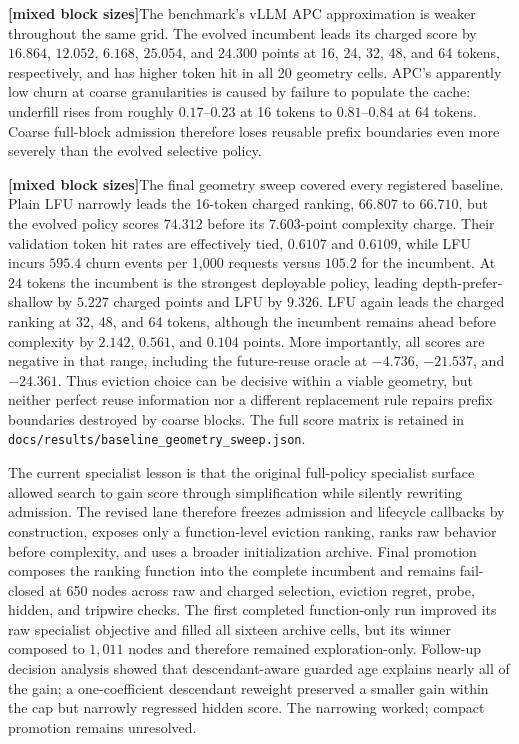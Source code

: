 \documentclass[11pt]{article}
\newcommand{\filepath}[1]{\nolinkurl{#1}}
\newcommand{\mixedblocktag}{\textbf{\color{navy}[mixed block sizes]}}
\begin{document}
\mixedblocktag The benchmark's vLLM APC approximation is weaker throughout the same grid.  The
evolved incumbent leads its charged score by \(16.864\), \(12.052\), \(6.168\),
\(25.054\), and \(24.300\) points at 16, 24, 32, 48, and 64 tokens,
respectively, and has higher token hit in all 20 geometry cells.  APC's apparently
low churn at coarse granularities is caused by failure to populate the cache:
underfill rises from roughly \(0.17\)--\(0.23\) at 16 tokens to
\(0.81\)--\(0.84\) at 64 tokens.  Coarse full-block admission therefore loses
reusable prefix boundaries even more severely than the evolved selective policy.

\mixedblocktag The final geometry sweep covered every registered baseline.  Plain LFU narrowly
leads the 16-token charged ranking, \(66.807\) to \(66.710\), but the evolved
policy scores \(74.312\) before its \(7.603\)-point complexity charge.  Their
validation token hit rates are effectively tied, \(0.6107\) and \(0.6109\), while
LFU incurs \(595.4\) churn events per 1,000 requests versus \(105.2\) for the
incumbent.  At 24 tokens the incumbent is the strongest deployable policy,
leading depth-prefer-shallow by \(5.227\) charged points and LFU by \(9.326\).
LFU again leads the charged ranking at 32, 48, and 64 tokens, although the
incumbent remains ahead before complexity by \(2.142\), \(0.561\), and \(0.104\)
points.  More importantly, all scores are negative in that range, including the
future-reuse oracle at \(-4.736\), \(-21.537\), and \(-24.361\).  Thus eviction
choice can be decisive within a viable geometry, but neither perfect reuse
information nor a different replacement rule repairs prefix boundaries destroyed
by coarse blocks.  The full score matrix is retained in
\filepath{docs/results/baseline_geometry_sweep.json}.

The current specialist lesson is that the original full-policy specialist surface
allowed search to gain score through simplification while silently rewriting
admission.  The revised lane therefore freezes admission and lifecycle callbacks by
construction, exposes only a function-level eviction ranking, ranks raw behavior
before complexity, and uses a broader initialization archive.  Final promotion
composes the ranking function into the complete incumbent and remains fail-closed at
650 nodes across raw and charged selection, eviction regret, probe, hidden, and
tripwire checks.
The first completed function-only run improved its raw specialist objective and filled
all sixteen archive cells, but its winner composed to \(1{,}011\) nodes and therefore
remained exploration-only.  Follow-up decision analysis showed that descendant-aware
guarded age explains nearly all of the gain; a one-coefficient descendant reweight
preserved a smaller gain within the cap but narrowly regressed hidden score.  The
narrowing worked; compact promotion remains unresolved.
\end{document}
